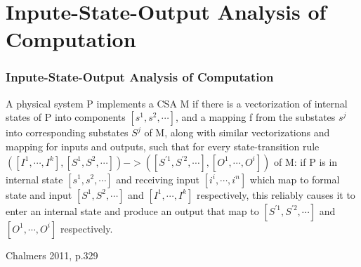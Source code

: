 \documentclass{beamer}
\begin{document}

\section{Inpute-State-Output Analysis of Computation}
\begin{frame}
\frametitle{\textbf{Inpute-State-Output Analysis of Computation} }

A physical system P implements a CSA M if there is a vectorization of internal states of P into components $\left[s^1, s^2, \cdots\right]$, and a mapping f from the substates $s^j$ into corresponding substates $S^j$ of M, along with similar vectorizations and mapping for inputs and outputs, such that for every state-transition rule $\left(\left[I^1, \cdots, I^k\right],\left[S^1, S^2, \cdots\right]\right) -> \left(\left[S^{\prime 1}, S^{\prime 2}, \cdots\right],\left[O^1, \cdots, O^i\right]\right)$ of M: if P is in internal state $\left[s^1, s^2, \cdots\right]$ and receiving input $\left[i^i, \cdots, i^n\right]$ which map to formal state and input $\left[S^1, S^2, \cdots\right]$ and $\left[I^1, \cdots, I^k\right]$ respectively, this reliably causes it to enter an internal state and produce an output that map to $\left[S^{\prime 1}, S^{\prime 2}, \cdots\right]$ and $\left[O^1, \cdots, O^i\right]$ respectively. 

Chalmers 2011, p.329


\end{frame}

\end{document}
